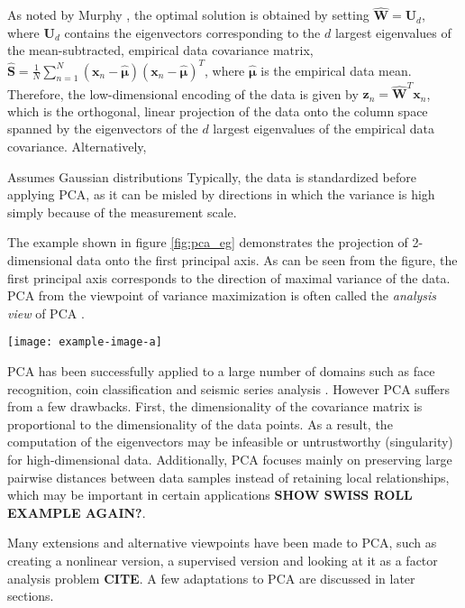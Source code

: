 \noindent
As noted by Murphy \citep{Murphy2012}, the optimal solution is obtained by setting $\hat{\bm{W}} = \bm{U}_{d}$, where $\bm{U}_{d}$ contains the eigenvectors corresponding to the $d$ largest eigenvalues of the mean-subtracted, empirical data covariance matrix, $\hat{\bm{S}} = \frac{1}{N}\sum_{n=1}^{N}(\bm{x}_{n}-\hat{\bm{\mu}})(\bm{x}_{n}-\hat{\bm{\mu}})^{T}$, where $\hat{\bm{\mu}}$ is the empirical data mean.  Therefore, the low-dimensional encoding of the data is given by $\bm{z}_n = \hat{\bm{W}}^{T}\bm{x}_n$, which is the orthogonal, linear projection of the data onto the column space spanned by the eigenvectors of the $d$ largest eigenvalues of the empirical data covariance.  Alternatively, 


Assumes Gaussian distributions
Typically, the data is standardized before applying PCA, as it can be misled by directions in which the variance is high simply because of the measurement scale.

The example shown in figure \ref{fig:pca_eg} demonstrates the projection of 2-dimensional data onto the first principal axis.  As can be seen from the figure, the first principal axis corresponds to the direction of maximal variance of the data.  PCA from the viewpoint of variance maximization is often called the \textit{analysis view} of PCA \citep{Murphy2012}.

\begin{center}
	\begin{figure*}[h]
		\centering
		\texttt{[image: example-image-a]}
		\caption[PCA Example.]{Placeholder for PCA projection example.}
		\label{fig:pca_eg}
	\end{figure*}
\end{center}


PCA has been successfully applied to a large  number of domains such as face recognition, coin classification and seismic series analysis \citep{VanDerMaaten2009DRReview}. However PCA suffers from a few drawbacks.  First, the dimensionality of the covariance matrix is proportional to the dimensionality of the data points.  As a result, the computation of the eigenvectors may be infeasible or untrustworthy (singularity) for high-dimensional data.  Additionally, PCA focuses mainly on preserving large pairwise distances between data samples instead of retaining local relationships, which may be important in certain applications \textbf{SHOW SWISS ROLL EXAMPLE AGAIN?}.

Many extensions and alternative viewpoints have been made to PCA, such as creating a nonlinear version, a supervised version and looking at it as a factor analysis problem \textbf{CITE}.  A few adaptations to PCA are discussed in later sections.





